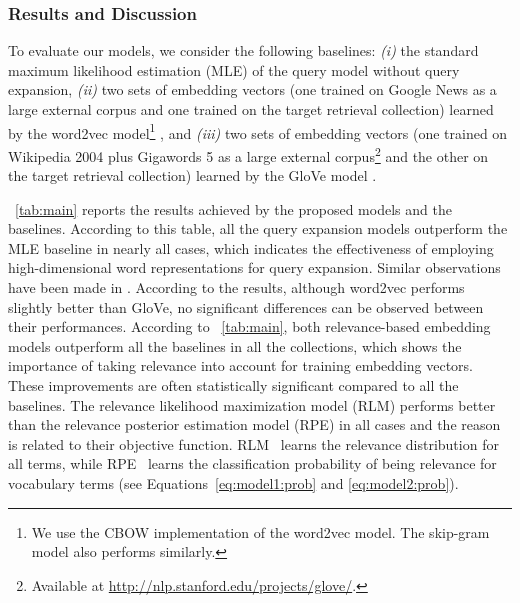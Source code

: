 \documentclass[sigconf]{acmart}
\begin{document}
\subsubsection{Results and Discussion}
To evaluate our models, we consider the following baselines: \textit{(i)} the standard maximum likelihood estimation (MLE) of the query model without query expansion, \textit{(ii)} two sets of embedding vectors (one trained on Google News as a large external corpus and one trained on the target retrieval collection) learned by the word2vec model\footnote{We use the CBOW implementation of the word2vec model. The skip-gram model also performs similarly.} \cite{Mikolov:2013}, and \textit{(iii)} two sets of embedding vectors (one trained on Wikipedia 2004 plus Gigawords 5 as a large external corpus\footnote{Available at \url{http://nlp.stanford.edu/projects/glove/}.} and the other on the target retrieval collection) learned by the GloVe model \cite{Pennington:2014}.

\tablename~\ref{tab:main} reports the results achieved by the proposed models and the baselines. According to this table, all the query expansion models outperform the MLE baseline in nearly all cases, which indicates the effectiveness of employing high-dimensional word representations for query expansion. Similar observations have been made in \cite{Diaz:2016,Kuzi:2016,Zamani:2016:ICTIR:emb,Zamani:2016:ICTIR:pqv}. According to the results, although word2vec performs slightly better than GloVe, no significant differences can be observed between their performances. According to \tablename~\ref{tab:main}, both relevance-based embedding models outperform all the baselines in all the collections, which shows the importance of taking relevance into account for training embedding vectors. These improvements are often statistically significant compared to all the baselines. The relevance likelihood maximization model (RLM) performs better than the relevance posterior estimation model (RPE) in all cases and the reason is related to their objective function. {RLM~} learns the relevance distribution for all terms, while {RPE~} learns the classification probability of being relevance for vocabulary terms (see Equations~\eqref{eq:model1:prob} and \eqref{eq:model2:prob}).
\end{document}
